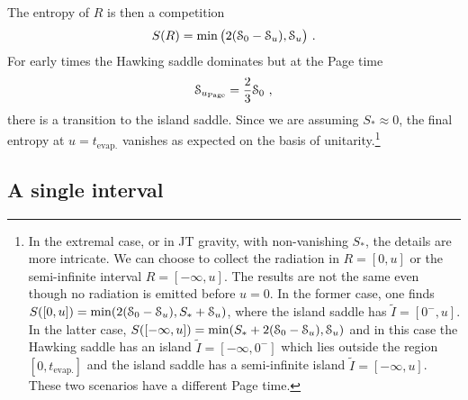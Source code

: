 \documentclass[12pt]{article}
\newcommand\ZZ{\EuScript S}
\newcommand{\EQ}[1]{\begin{equation}\begin{split} #1
\end{split}\end{equation}}
\begin{document}
The entropy of $R$ is then a competition
\EQ{
S(R)=\min\big(2(\ZZ_0-\ZZ_u),\ZZ_u\big)\ .
}
For early times the Hawking saddle dominates but at the Page time
\EQ{
\ZZ_{u_\text{Page}}=\frac23\ZZ_0\ ,
}
there is a transition to the island saddle. Since we are assuming $S_*\approx0$, the final entropy at $u=t_\text{evap.}$ vanishes as expected on the basis of unitarity.\footnote{In the extremal case, or in JT gravity, with non-vanishing $S_*$, the details are more intricate. We can choose to collect the radiation in $R=[0,u]$ or the semi-infinite interval $R=[-\infty,u]$. The results are not the same even though no radiation is emitted before $u=0$. In the former case, one finds $S([0,u])=\min(2(\ZZ_0-\ZZ_u),S_*+\ZZ_u)$, where the island saddle has $\tilde I=[0^-,u]$. In the latter case, $S([-\infty,u])=\min(S_*+2(\ZZ_0-\ZZ_u),\ZZ_u)$ and in this case the Hawking saddle has an island $\tilde I=[-\infty,0^-]$ which lies outside the region $[0,t_\text{evap.}]$ and the island saddle has a semi-infinite island $\tilde I=[-\infty,u]$. These two scenarios have a different Page time.}
 
\subsection{A single interval}
\end{document}
